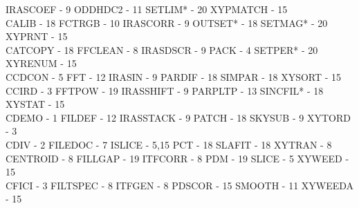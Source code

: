 {\begin{tabbing}
   \>IRASCOEF - 9                            \>
 ODDHDC2 - 11                            \>SETLIM* - 20                          
   \>XYPMATCH - 15                           \\
 CALIB - 18                              \>FCTRGB - 10                           
   \>IRASCORR - 9                            \>
 OUTSET* - 18                            \>SETMAG* - 20                          
   \>XYPRNT - 15                             \\
 CATCOPY - 18                            \>FFCLEAN - 8                           
   \>IRASDSCR - 9                            \>
 PACK - 4                                \>SETPER* - 20                          
   \>XYRENUM - 15                            \\
 CCDCON - 5                              \>FFT - 12                              
   \>IRASIN - 9                              \>
 PARDIF - 18                             \>SIMPAR - 18                           
   \>XYSORT - 15                             \\
 CCIRD - 3                               \>FFTPOW - 19                           
   \>IRASSHIFT - 9                           \>
 PARPLTP - 13                            \>SINCFIL* - 18                         
   \>XYSTAT - 15                             \\
 CDEMO - 1                               \>FILDEF - 12                           
   \>IRASSTACK - 9                           \>
 PATCH - 18                              \>SKYSUB - 9                            
   \>XYTORD - 3                              \\
 CDIV - 2                                \>FILEDOC - 7                           
   \>ISLICE - 5,15                           \>
 PCT - 18                                \>SLAFIT - 18                           
   \>XYTRAN - 8                              \\
 CENTROID - 8                            \>FILLGAP - 19                          
   \>ITFCORR - 8                             \>
 PDM - 19                                \>SLICE - 5                             
   \>XYWEED - 15                             \\
 CFICI - 3                               \>FILTSPEC - 8                          
   \>ITFGEN - 8                              \>
 PDSCOR - 15                             \>SMOOTH - 11                           
   \>XYWEEDA - 15                            \\

\end{tabbing}}
